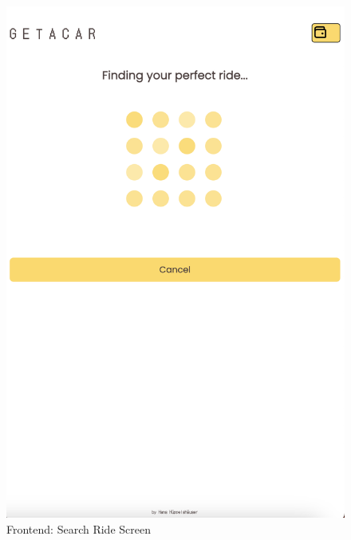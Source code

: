 \begin{figure}[h]
\begin{minipage}{0.45\linewidth}
        \includegraphics[width=\linewidth]{data/ffss/4.png}
        \caption{Frontend: Search Ride Screen}
        \label{fig:SearchRideScreen}
    \end{minipage}
    
\end{figure}


